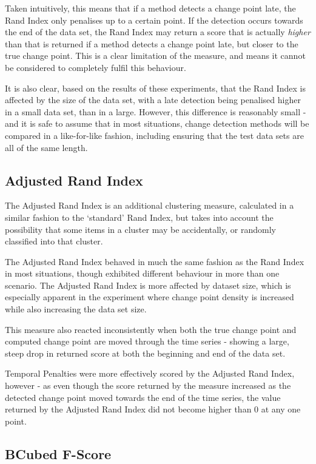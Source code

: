\documentclass[../main.tex]{subfiles}
\begin{document}
Taken intuitively, this means that if a method detects a change point late, the Rand Index only penalises up to a certain point. If the detection occurs towards the end of the data set, the Rand Index may return a score that is actually \emph{higher} than that is returned if a method detects a change point late, but closer to the true change point. This is a clear limitation of the measure, and means it cannot be considered to completely fulfil this behaviour.

It is also clear, based on the results of these experiments, that the Rand Index is affected by the size of the data set, with a late detection being penalised higher in a small data set, than in a large. However, this difference is reasonably small - and it is safe to assume that in most situations, change detection methods will be compared in a like-for-like fashion, including ensuring that the test data sets are all of the same length.

\subsection{Adjusted Rand Index}

The Adjusted Rand Index is an additional clustering measure, calculated in a similar fashion to the `standard' Rand Index, but takes into account the possibility that some items in a cluster may be accidentally, or randomly classified into that cluster.

The Adjusted Rand Index behaved in much the same fashion as the Rand Index in most situations, though exhibited different behaviour in more than one scenario. The Adjusted Rand Index is more affected by dataset size, which is especially apparent in the experiment where change point density is increased while also increasing the data set size.

This measure also reacted inconsistently when both the true change point and computed change point are moved through the time series - showing a large, steep drop in returned score at both the beginning and end of the data set.

Temporal Penalties were more effectively scored by the Adjusted Rand Index, however - as even though the score returned by the measure increased as the detected change point moved towards the end of the time series, the value returned by the Adjusted Rand Index did not become higher than 0 at any one point.

\subsection{BCubed F-Score}
\end{document}
